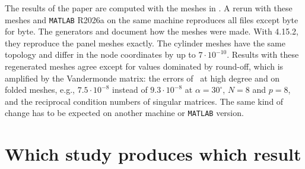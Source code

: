 The results of the paper are computed with the meshes in .
A rerun with these meshes and \texttt{MATLAB} R2026a on the same machine reproduces
all files except  byte for byte. The generators
 and  document how the meshes
were made. With  4.15.2, they reproduce the panel meshes exactly. The
cylinder meshes have the same topology and differ in the node coordinates by up to
$7\cdot10^{-10}$. Results with these regenerated meshes agree except for values
dominated by round-off, which is amplified by the Vandermonde matrix: the errors of
\PM\ at high degree and on folded meshes, e.g., $7.5\cdot10^{-8}$ instead of
$9.3\cdot10^{-8}$ at $\alpha=30^\circ$, $N=8$ and $p=8$, and the reciprocal condition
numbers of singular matrices. The same kind of change has to be expected on another
machine or \texttt{MATLAB} version.

\section{Which study produces which result}

